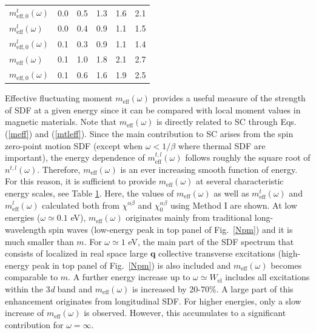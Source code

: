 \begin{table}[h!]
\begin{center}
\begin{tabular}{l|ccccc}
\phantom{Ni:} $m_{\text{eff},0}^{t}(\omega)$ & 0.0 & 0.5 & 1.3 & 1.6 & 2.1 \\
\phantom{Ni:} $m_{\text{eff}}^{l}(\omega)$  & 0.0 & 0.4 & 0.9 & 1.1 & 1.5 \\
\phantom{Ni:} $m_{\text{eff},0}^{l}(\omega)$ & 0.1 & 0.3 & 0.9 & 1.1 & 1.4 \\
\phantom{Ni:} $m_{\text{eff}}(\omega)$    & 0.1 & 1.0 & 1.8 & 2.1 & 2.7 \\
\phantom{Ni:} $m_{\text{eff},0}(\omega)$   & 0.1 & 0.6 & 1.6 & 1.9 & 2.5 \\
\end{tabular}
\label{tab1}
\end{center}
\end{table}

Effective fluctuating moment $m_{\text{eff}}(\omega)$ provides a useful measure of the strength of SDF at a given energy since it can be compared with local moment values in magnetic materials. Note that $m_{\text{eff}}(\omega)$ is directly related to SC through Eqs. (\ref{meff}) and (\ref{mtleff}). Since the main contribution to SC arises from the spin zero-point motion SDF (except when $\omega<1/\beta$ where thermal SDF are important), the energy dependence of $m_{\text{eff}}^{t,l}(\omega)$ follows roughly the square root of $n^{t,l}(\omega)$. Therefore, $m_{\text{eff}}(\omega)$ is an ever increasing smooth function of energy. For this reason, it is sufficient to provide $m_{\text{eff}}(\omega)$ at several characteristic energy scales, see Table \ref{tab1}. Here, the values of $m_{\text{eff}}(\omega)$ as well as $m_{\text{eff}}^{t}(\omega)$ and $m_{\text{eff}}^{l}(\omega)$ calculated both from $\chi^{\alpha\beta}$ and $\chi_0^{\alpha\beta}$ using Method I are shown. At low energies ($\omega\simeq 0.1$ eV), $m_{\text{eff}}(\omega)$ originates mainly from traditional long-wavelength spin waves (low-energy peak in top panel of Fig.~\ref{Npm}) and it is much smaller than $m$. For $\omega\simeq 1$ eV, the main part of the SDF spectrum that consists of localized in real space large $\mathbf{q}$ collective transverse excitations (high-energy peak in top panel of Fig.~\ref{Npm}) is also included and $m_{\text{eff}}(\omega)$ becomes comparable to $m$. A further energy increase up to $\omega\simeq W_{\text{el}}$ includes all excitations within the 3\emph{d} band and $m_{\text{eff}}(\omega)$ is increased by 20-70\%. A large part of this enhancement originates from longitudinal SDF. For higher energies, only a slow increase of $m_{\text{eff}}(\omega)$ is observed. However, this accumulates to a significant contribution for $\omega=\infty$.

